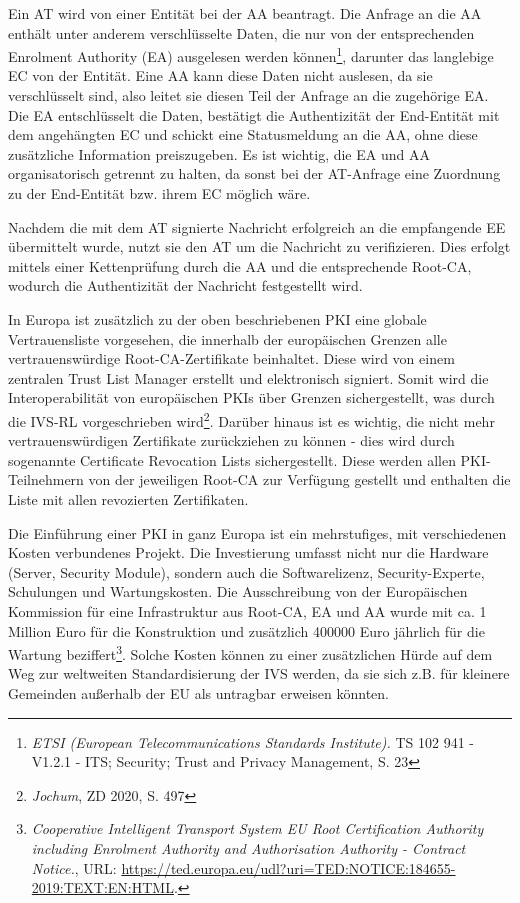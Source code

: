 Ein AT wird von einer Entität bei der AA beantragt. Die Anfrage an die AA enthält unter anderem verschlüsselte Daten, die nur von der entsprechenden Enrolment Authority (EA) ausgelesen werden können\footnote{\emph{ETSI (European Telecommunications Standards Institute).} TS 102 941 - V1.2.1 - ITS; Security; Trust and Privacy Management, S. 23}\nocite{ETSI2018}, darunter das langlebige EC von der Entität. Eine AA kann diese Daten nicht auslesen, da sie verschlüsselt sind, also leitet sie diesen Teil der Anfrage an die zugehörige EA. Die EA entschlüsselt die Daten, bestätigt die Authentizität der End-Entität mit dem angehängten EC und schickt eine Statusmeldung an die AA, ohne diese zusätzliche Information preiszugeben. Es ist wichtig, die EA und AA organisatorisch getrennt zu halten, da sonst bei der AT-Anfrage eine Zuordnung zu der End-Entität bzw. ihrem EC möglich wäre.

Nachdem die mit dem AT signierte Nachricht erfolgreich an die empfangende EE übermittelt wurde, nutzt sie den AT um die Nachricht zu verifizieren. Dies erfolgt mittels einer Kettenprüfung durch die AA und die entsprechende Root-CA, wodurch die Authentizität der Nachricht festgestellt wird.

In Europa ist zusätzlich zu der oben beschriebenen PKI eine globale Vertrauensliste vorgesehen, die innerhalb der europäischen Grenzen alle vertrauenswürdige Root-CA-Zertifikate beinhaltet. Diese wird von einem zentralen Trust List Manager erstellt und elektronisch signiert. Somit wird die Interoperabilität von europäischen PKIs über Grenzen sichergestellt, was durch die IVS-RL vorgeschrieben wird\footnote{\emph{Jochum}, ZD 2020, S. 497}. Darüber hinaus ist es wichtig, die nicht mehr vertrauenswürdigen Zertifikate zurückziehen zu können - dies wird durch sogenannte Certificate Revocation Lists sichergestellt. Diese werden allen PKI-Teilnehmern von der jeweiligen Root-CA zur Verfügung gestellt und enthalten die Liste mit allen revozierten Zertifikaten. 

Die Einführung einer PKI in ganz Europa ist ein mehrstufiges, mit verschiedenen Kosten verbundenes Projekt. Die Investierung umfasst nicht nur die Hardware (Server, Security Module), sondern auch die Softwarelizenz, Security-Experte, Schulungen und Wartungskosten. Die Ausschreibung von der Europäischen Kommission für eine Infrastruktur aus Root-CA, EA und AA wurde mit ca. 1 Million Euro für die Konstruktion und zusätzlich 400000 Euro jährlich für die Wartung beziffert\footnote{\emph{Cooperative Intelligent Transport System EU Root Certification Authority including Enrolment Authority and Authorisation Authority - Contract Notice.}, URL: \url{https://ted.europa.eu/udl?uri=TED:NOTICE:184655-2019:TEXT:EN:HTML}.}\nocite{Tender}. Solche Kosten können zu einer zusätzlichen Hürde auf dem Weg zur weltweiten Standardisierung der IVS werden, da sie sich z.B. für kleinere Gemeinden außerhalb der EU als untragbar erweisen könnten.

